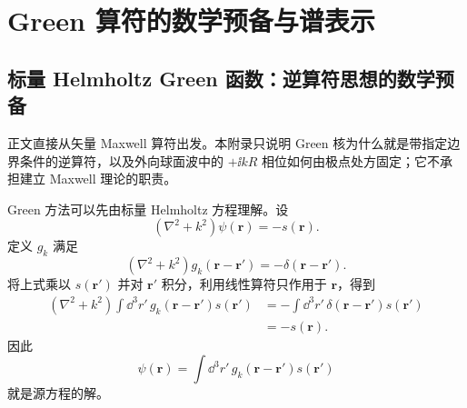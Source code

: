 \chapter{Green 算符的数学预备与谱表示}
\label{app:green-spectral}

\section{标量 Helmholtz Green 函数：逆算符思想的数学预备}
\label{app:scalar-green-prelude}

正文直接从矢量 Maxwell 算符出发。本附录只说明 Green 核为什么就是带指定边界条件的逆算符，以及外向球面波中的 $+\ii kR$ 相位如何由极点处方固定；它不承担建立 Maxwell 理论的职责。

Green 方法可以先由标量 Helmholtz 方程理解。设
\begin{equation}
(\nabla^2+k^2)\psi(\bm r)=-s(\bm r).
\label{eq:scalar-helmholtz-source}
\end{equation}
定义 $g_k$ 满足
\begin{equation}
(\nabla^2+k^2)g_k(\bm r-\bm r')=-\delta(\bm r-\bm r').
\label{eq:scalar-green-def}
\end{equation}
将上式乘以 $s(\bm r')$ 并对 $\bm r'$ 积分，利用线性算符只作用于 $\bm r$，得到
\begin{align}
(\nabla^2+k^2)
\int \dd^3r'\,g_k(\bm r-\bm r')s(\bm r')
&=-\int \dd^3r'\,\delta(\bm r-\bm r')s(\bm r')\\
&=-s(\bm r).
\end{align}
因此
\begin{equation}
\psi(\bm r)=\int \dd^3r'\,g_k(\bm r-\bm r')s(\bm r')
\label{eq:scalar-green-solution}
\end{equation}
就是源方程的解。

